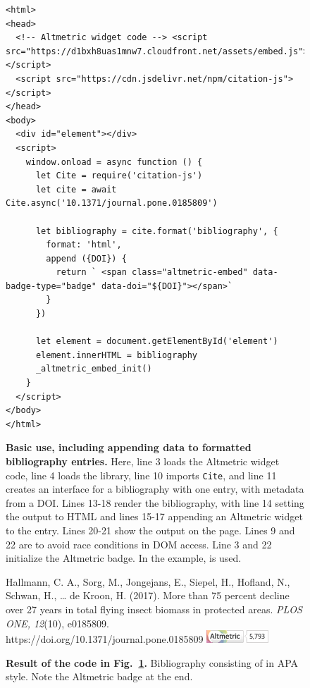 \documentclass[fleqn,10pt,lineno]{wlpeerj} %
\begin{document}
\begin{figure}[bt!]
\centering
\begin{small}
\begin{verbatim}
<html>
<head>
  <!-- Altmetric widget code --> <script src="https://d1bxh8uas1mnw7.cloudfront.net/assets/embed.js"></script>
  <script src="https://cdn.jsdelivr.net/npm/citation-js"></script>
</head>
<body>
  <div id="element"></div>
  <script>
    window.onload = async function () {
      let Cite = require('citation-js')
      let cite = await Cite.async('10.1371/journal.pone.0185809')
      
      let bibliography = cite.format('bibliography', {
        format: 'html',
        append ({DOI}) {
          return ` <span class="altmetric-embed" data-badge-type="badge" data-doi="${DOI}"></span>`
        }
      })
    
      let element = document.getElementById('element')
      element.innerHTML = bibliography
      _altmetric_embed_init()
    }
  </script>
</body>
</html>
\end{verbatim}
\end{small}
\caption{\textbf{Basic use, including appending data to formatted bibliography entries.}
Here, line 3 loads the Altmetric widget code, line 4 loads the library, line 10 imports \texttt{Cite}, and line 11 creates an interface for a bibliography with one entry, with metadata from a DOI. Lines 13-18 render the bibliography, with line 14 setting the output to HTML and lines 15-17 appending an Altmetric widget to the entry. Lines 20-21 show the output on the page. Lines 9 and 22 are to avoid race conditions in DOM access. Line 3 and 22 initialize the Altmetric badge. In the example, \citep{hallmann_more_2017} is used.
}
\label{code:use}
\end{figure}

\begin{figure}[bt!]
\begin{small}
Hallmann, C. A., Sorg, M., Jongejans, E., Siepel, H., Hofland, N., Schwan, H., … de Kroon, H. (2017). More than 75 percent decline over 27 years in total flying insect biomass in protected areas. \emph{PLOS ONE, 12}(10), e0185809. https://doi.org/10.1371/journal.pone.0185809 \includegraphics[height=1.5\fontcharht\font`\B]{altmetric.png}
\end{small}
\caption{\textbf{Result of the code in Fig.~\ref{code:use}.} Bibliography consisting of \cite{hallmann_more_2017} in APA style. Note the Altmetric badge at the end.}
\label{fig:use}
\end{figure}
\end{document}
